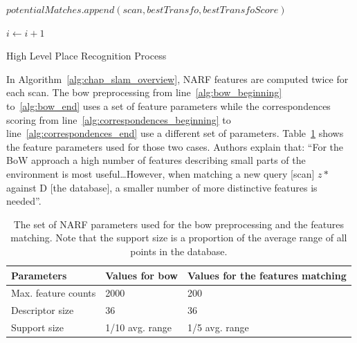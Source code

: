 \begin{algorithm}
\begin{algorithmic}[1]
        \State
        \State $potentialMatches.append(scan, bestTransfo, bestTransfoScore)$
        \EndIf

        \State
        \State $i \gets i+1$
        \EndWhile \label{alg:correspondences_end}

        \State
        \State {}
        \EndFunction
    \end{algorithmic}

    \caption{High Level Place Recognition Process}
    \label{alg:chap_slam_overview}
\end{algorithm}

In Algorithm~\ref{alg:chap_slam_overview}, NARF features are computed twice for each scan. The \gls*{bow} preprocessing from line~\ref{alg:bow_beginning} to~\ref{alg:bow_end} uses a set of feature parameters while the correspondences scoring from line~\ref{alg:correspondences_beginning} to line~\ref{alg:correspondences_end} use a different set of parameters. Table~\ref{tab:chap_slam_narf_parameters} shows the feature parameters used for those two cases. Authors explain that: \enquote{For the BoW approach a high number of features describing small parts of the environment is most useful\dots However, when matching a new query [scan] $z*$ against D [the database], a smaller number of more distinctive features is needed}.

\begin{table}[H]
    \centering
    \begin{tabular}{@{}lll@{}}
        \toprule
        \textbf{Parameters}  & \textbf{Values for \gls*{bow}} & \textbf{Values for the features matching} \\
        \hline
        Max. feature counts & 2000                          & 200                                \\
        Descriptor size     & 36                            & 36                                 \\
        Support size        & 1/10 avg. range               & 1/5 avg. range                     \\
        \bottomrule
    \end{tabular}
    \caption{The set of NARF parameters used for the \gls*{bow} preprocessing and the features matching. Note that the support size is a proportion of the average range of all points in the database.}
    \label{tab:chap_slam_narf_parameters}
\end{table}

